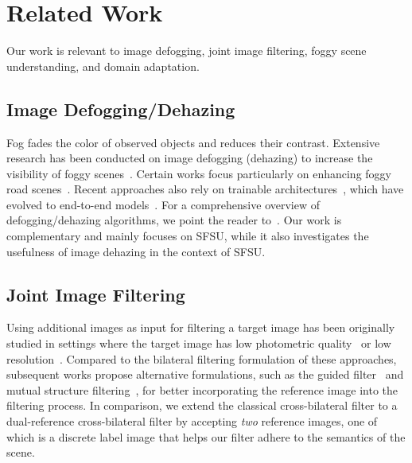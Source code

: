 \documentclass[twocolumn]{svjour3}          \smartqed  \usepackage{graphicx}
\begin{document}
\section{Related Work}
\label{sec:related}

Our work is relevant to image defogging, joint image filtering, foggy scene understanding, and domain adaptation.

\subsection{Image Defogging/Dehazing}
Fog fades the color of observed objects and reduces their contrast. Extensive research has been conducted on image defogging (dehazing) to increase the visibility of foggy scenes~\cite{contrast:weather:degraded,tan2008visibility,bayesian:defogging,fattal2008single,nonlocal:image:dehazing,fattal2014dehazing,dark:channel}. Certain works focus particularly on enhancing foggy road scenes~\cite{THC+12,exponential:contrast:restoration}. Recent approaches also rely on trainable architectures~\cite{TYW14}, which have evolved to end-to-end models~\cite{joint:transmission:estimation:dehazing,deep:transmission:network}. For a comprehensive overview of defogging/dehazing algorithms, we point the reader to~\cite{review:defogging:restoration,dehazing:survey:benchmarking}. Our work is complementary and mainly focuses on SFSU, while it also investigates the usefulness of image dehazing in the context of SFSU. 

\subsection{Joint Image Filtering}
Using additional images as input for filtering a target image has been originally studied in settings where the target image has low photometric quality~\cite{flash:enhance:crossbilateral:Eisemann,flash:enhance:crossbilateral:Petschnigg} or low resolution~\cite{joint:bilateral:upsampling}. Compared to the bilateral filtering formulation of these approaches, subsequent works propose alternative formulations, such as the guided filter~\cite{guided:filtering} and mutual structure filtering~\cite{mutual:structure:filtering}, for better incorporating the reference image into the filtering process. In comparison, we extend the classical cross-bilateral filter to a dual-reference cross-bilateral filter by accepting \emph{two} reference images, one of which is a discrete label image that helps our filter adhere to the semantics of the scene.
\end{document}
